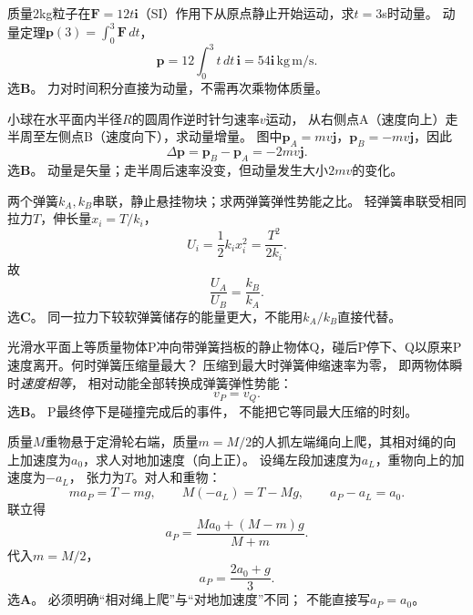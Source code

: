 \problemtext 质量2kg粒子在$\bm F=12t\bm i$（SI）作用下从原点静止开始运动，求$t=3$s时动量。
\workings
动量定理$\bm p(3)=\int_0^3\bm F\,dt$，
\[
\boxed{\bm p=12\int_0^3t\,dt\,\bm i
=54\bm i\,\mathrm{kg\,m/s}}.
\]
选\textbf{B}。
\crosscheck 力对时间积分直接为动量，不需再次乘物体质量。

\problemtext 小球在水平面内半径$R$的圆周作逆时针匀速率$v$运动，
从右侧点A（速度向上）走半周至左侧点B（速度向下），求动量增量。
\workings
图中$\bm p_A=mv\bm j$，$\bm p_B=-mv\bm j$，因此
\[
\boxed{\Delta\bm p=\bm p_B-\bm p_A=-2mv\bm j}.
\]
选\textbf{B}。
\crosscheck 动量是矢量；走半周后速率没变，但动量发生大小$2mv$的变化。

\problemtext 两个弹簧$k_A,k_B$串联，静止悬挂物块；求两弹簧弹性势能之比。
\workings
轻弹簧串联受相同拉力$T$，伸长量$x_i=T/k_i$，
\[
U_i=\frac12 k_ix_i^2=\frac{T^2}{2k_i}.
\]
故
\[
\boxed{\frac{U_A}{U_B}=\frac{k_B}{k_A}}.
\]
选\textbf{C}。
\crosscheck 同一拉力下较软弹簧储存的能量更大，不能用$k_A/k_B$直接代替。

\problemtext 光滑水平面上等质量物体P冲向带弹簧挡板的静止物体Q，碰后P停下、Q以原来P速度离开。何时弹簧压缩量最大？
\workings
压缩到最大时弹簧伸缩速率为零，
即两物体瞬时\emph{速度相等}，
相对动能全部转换成弹簧弹性势能：
\[
\boxed{v_P=v_Q}.
\]
选\textbf{B}。
\crosscheck P最终停下是碰撞完成后的事件，
不能把它等同最大压缩的时刻。

\problemtext 质量$M$重物悬于定滑轮右端，质量$m=M/2$的人抓左端绳向上爬，其相对绳的向上加速度为$a_0$，求人对地加速度（向上正）。
\workings
设绳左段加速度为$a_L$，重物向上的加速度为$-a_L$，
张力为$T$。对人和重物：
\[
ma_P=T-mg,\qquad
M(-a_L)=T-Mg,\qquad a_P-a_L=a_0.
\]
联立得
\[
a_P=\frac{M a_0+(M-m)g}{M+m}.
\]
代入$m=M/2$，
\[
\boxed{a_P=\frac{2a_0+g}{3}}.
\]
选\textbf{A}。
\crosscheck 必须明确“相对绳上爬”与“对地加速度”不同；
不能直接写$a_P=a_0$。
